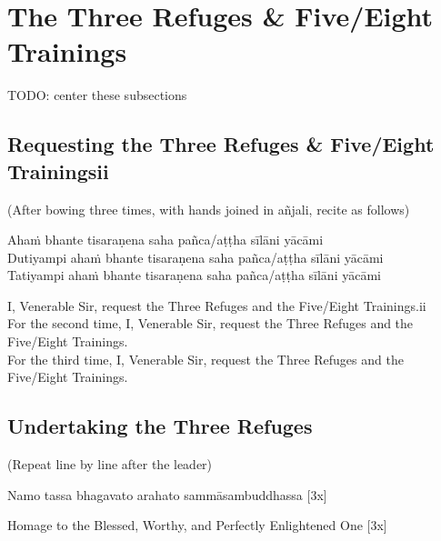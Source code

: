 \section*{The Three Refuges \& Five/Eight Trainings}
TODO: center these subsections
\subsection{Requesting the Three Refuges \& Five/Eight Trainingsii}


\begin{center}
(After bowing three times, with hands joined in añjali, recite as follows)\\
\end{center}

Ahaṁ bhante tisaraṇena saha pañca/aṭṭha sīlāni yācāmi\\
Dutiyampi ahaṁ bhante tisaraṇena saha pañca/aṭṭha sīlāni yācāmi\\
Tatiyampi ahaṁ bhante tisaraṇena saha pañca/aṭṭha sīlāni yācāmi\\

\begin{english}
I, Venerable Sir, request the Three Refuges and the Five/Eight Trainings.ii\\
For the second time, I, Venerable Sir, request the Three Refuges and the Five/Eight Trainings.\\
For the third time, I, Venerable Sir, request the Three Refuges and the Five/Eight Trainings.
\end{english}

\subsection*{Undertaking the Three Refuges}

\begin{center}
(Repeat line by line after the leader)\\
\end{center}

Namo tassa bhagavato arahato sammāsambuddhassa \hfill{[3x]}\\

\begin{english}
Homage to the Blessed, Worthy, and Perfectly Enlightened One \hfill{[3x]}\\
\end{english}

